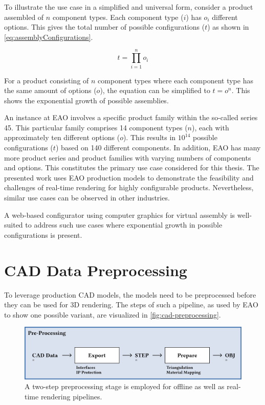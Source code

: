 To illustrate the use case in a simplified and universal form, consider a product assembled of $n$ component types. Each component type ($i$) has $o_i$ different options. This gives the total number of possible configurations ($t$) as shown in \autoref{eq:assemblyConfigurations}.

\begin{equation}
  t = \prod_{i=1}^n o_i
  \label{eq:assemblyConfigurations}
\end{equation}

For a product consisting of $n$ component types where each component type has the same amount of options ($o$), the equation can be simplified to $t = o^n$. This shows the exponential growth of possible assemblies.

An instance at EAO involves a specific product family within the so-called series 45. This particular family comprises 14 component types ($n$), each with approximately ten different options ($o$). This results in $10^{14}$ possible configurations ($t$) based on 140 different components. In addition, EAO has many more product series and product families with varying numbers of components and options. This constitutes the primary use case considered for this thesis. The presented work uses EAO production models to demonstrate the feasibility and challenges of real-time rendering for highly configurable products. Nevertheless, similar use cases can be observed in other industries.

A web-based configurator using computer graphics for virtual assembly is well-suited to address such use cases where exponential growth in possible configurations is present.

\section{CAD Data Preprocessing}

To leverage production \gls{CAD} models, the models need to be preprocessed before they can be used for 3D rendering. The steps of such a pipeline, as used by EAO to show one possible variant, are visualized in \autoref{fig:cad-preprocessing}.

\begin{figure}[H]
  \centering
  \includegraphics[width=0.9\columnwidth]{resources/cad-pipeline-preprocessing.png}
  \caption{A two-step preprocessing stage is employed for offline as well as real-time rendering pipelines.}
  \label{fig:cad-preprocessing}
\end{figure}

